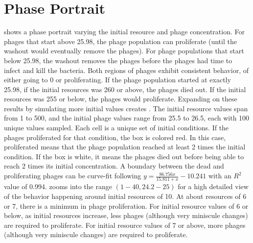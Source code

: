 \section{Phase Portrait}
\label{sec:results:phase_portrait}
 shows a phase portrait varying the initial resource and phage concentration. 
For phages that start above 25.98, the phage population can proliferate (until the washout would eventually remove the phages). 
For phage populations that start below 25.98, the washout removes the phages before the phages had time to infect and kill the bacteria. 
Both regions of phages exhibit consistent behavior, of either going to 0 or proliferating. 
If the phage population started at exactly 25.98, if the initial resources was 260 or above, the phages died out. 
If the initial resources was 255 or below, the phages would proliferate. 
Expanding on these results by simulating more initial values creates . 
The initial resource values span from 1 to 500, and the initial phage values range from 25.5 to 26.5, each with 100 unique values sampled.
Each cell is a unique set of initial conditions. 
If the phages proliferated for that condition, the box is colored red. 
In this case, proliferated means that the phage population reached at least 2 times the initial condition. 
If the box is white, it means  the phages died out before being able to reach 2 times its initial concentration. 
A boundary between the dead and proliferating phages can be curve-fit following $y=\frac{86.756x}{15.811+x} - 10.241$ with an $R^2$ value of 0.994. 
 zooms into the range $(1-40, 24.2-25)$ for a high detailed view of the behavior happening around initial resources of 10. 
At about resources of 6 or 7, there is a minimum in phage proliferation. 
For initial resource values of 6 or below, as initial resources increase, less phages (although very miniscule changes) are required to proliferate. 
For initial resource values of 7 or above, more phages (although very miniscule changes) are required to proliferate. 


